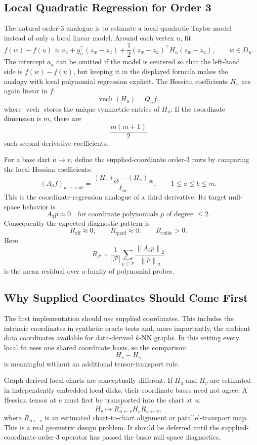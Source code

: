 \documentclass[11pt]{article}
\newcommand{\norm}[1]{\left\lVert #1 \right\rVert}
\begin{document}
\subsection{Local Quadratic Regression for Order 3}

The natural order-3 analogue is to estimate a local quadratic Taylor model
instead of only a local linear model.  Around each vertex \(u\), fit
\[
  f(w)-f(u)
  \approx
  a_u
  +
  g_u^\top(z_w-z_u)
  +
  \frac12 (z_w-z_u)^\top H_u (z_w-z_u),
  \qquad w\in D_u.
\]
The intercept \(a_u\) can be omitted if the model is centered so that the
left-hand side is \(f(w)-f(u)\), but keeping it in the displayed formula makes
the analogy with local polynomial regression explicit.  The Hessian
coefficients \(H_u\) are again linear in \(f\):
\[
  \operatorname{vech}(H_u) = Q_u f,
\]
where \(\operatorname{vech}\) stores the unique symmetric entries of
\(H_u\).  If the coordinate dimension is \(m\), there are
\[
  \frac{m(m+1)}{2}
\]
such second-derivative coefficients.

For a base dart \(u\to v\), define the supplied-coordinate order-3 rows by
comparing the local Hessian coefficients:
\[
  (A_3 f)_{u\to v,ab}
  =
  \frac{(H_v)_{ab}-(H_u)_{ab}}{\ell_{uv}},
  \qquad 1\le a\le b\le m.
\]
This is the coordinate-regression analogue of a third derivative.  Its target
null-space behavior is
\[
  A_3 p \approx 0
  \quad\text{for coordinate polynomials }p\text{ of degree }\le 2.
\]
Consequently the expected diagnostic pattern is
\[
  R_{\mathrm{aff}}\approx 0,\qquad
  R_{\mathrm{quad}}\approx 0,\qquad
  R_{\mathrm{cubic}}>0.
\]
Here
\[
  R_{\mathcal P}
  =
  \frac{1}{|\mathcal P|}
  \sum_{p\in\mathcal P}
  \frac{\norm{A_3p}_2}{\norm{p}_2}
\]
is the mean residual over a family of polynomial probes.

\subsection{Why Supplied Coordinates Should Come First}

The first implementation should use supplied coordinates.  This includes the
intrinsic coordinates in synthetic oracle tests and, more importantly, the
ambient data coordinates available for data-derived \(k\)-NN graphs.  In this
setting every local fit uses one shared coordinate basis, so the comparison
\[
  H_v-H_u
\]
is meaningful without an additional tensor-transport rule.

Graph-derived local charts are conceptually different.  If \(H_u\) and \(H_v\)
are estimated in independently embedded local disks, their coordinate bases
need not agree.  A Hessian tensor at \(v\) must first be transported into the
chart at \(u\):
\[
  H_v
  \longmapsto
  R_{u\leftarrow v}^{\top} H_v R_{u\leftarrow v},
\]
where \(R_{u\leftarrow v}\) is an estimated chart-to-chart alignment or
parallel-transport map.  This is a real geometric design problem.  It should
be deferred until the supplied-coordinate order-3 operator has passed the
basic null-space diagnostics.
\end{document}
